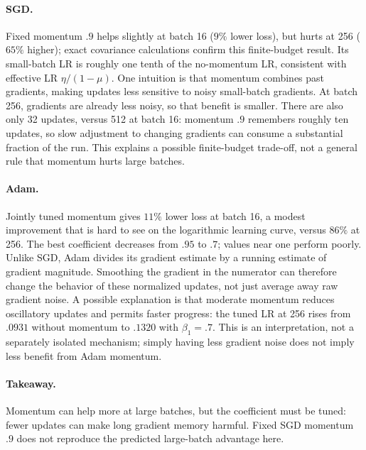\documentclass{article}
\begin{document}
\paragraph{SGD.} Fixed momentum $.9$ helps slightly at batch 16 ($9\%$ lower loss),
but hurts at 256 ($65\%$ higher); exact covariance calculations confirm
this finite-budget result. Its small-batch LR is roughly one tenth of
the no-momentum LR, consistent with effective LR $\eta/(1-\mu)$.
One intuition is that momentum combines past gradients, making updates
less sensitive to noisy small-batch gradients. At batch 256, gradients
are already less noisy, so that benefit is smaller. There are also only
32 updates, versus 512 at batch 16: momentum $.9$ remembers roughly ten
updates, so slow adjustment to changing gradients can consume a substantial
fraction of the run. This explains a possible finite-budget trade-off,
not a general rule that momentum hurts large batches.

\paragraph{Adam.} Jointly tuned momentum gives $11\%$ lower loss at batch
16, a modest improvement that is hard to see on the logarithmic learning
curve, versus $86\%$ at 256. The best coefficient decreases from $.95$
to $.7$; values near one perform poorly. Unlike SGD, Adam divides its
gradient estimate by a running estimate of gradient magnitude. Smoothing
the gradient in the numerator can therefore change the behavior of these
normalized updates, not just average away raw gradient noise. A possible
explanation is that moderate momentum reduces oscillatory updates and
permits faster progress: the tuned LR at 256 rises from $.0931$ without
momentum to $.1320$ with $\beta_1=.7$. This is an interpretation, not a
separately isolated mechanism; simply having less gradient noise does
not imply less benefit from Adam momentum.

\paragraph{Takeaway.} Momentum can help more at large batches, but the
coefficient must be tuned: fewer updates can make long gradient memory
harmful. Fixed SGD momentum $.9$ does not reproduce the predicted
large-batch advantage here.
\end{document}
